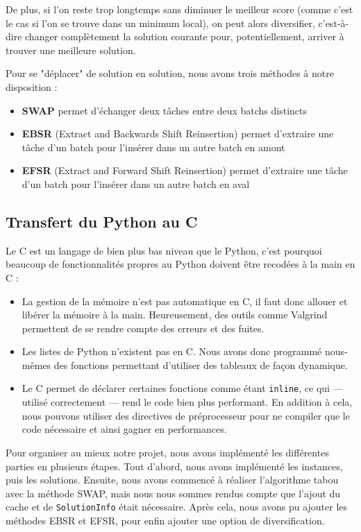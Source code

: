 \documentclass[hideweeklyreports]{polytech/polytech}
\newcommand{\codec}[1]{\texttt{#1}}
\begin{document}
				De plus, si l'on reste trop longtemps sans diminuer le meilleur score (comme c'est le cas si l'on se trouve dans un minimum local), on peut alors diversifier, c'est-à-dire changer complètement la solution courante pour, potentiellement, arriver à trouver une meilleure solution.
				
				\label{methR}
				Pour se "déplacer" de solution en solution, nous avons trois méthodes à notre disposition :
				\begin{itemize}
					\item \textbf{SWAP} permet d'échanger deux tâches entre deux batchs distincts
					\item \textbf{EBSR} (Extract and Backwards Shift Reinsertion) permet d'extraire une tâche d'un batch pour l'insérer dans un autre batch en amont
					\item \textbf{EFSR} (Extract and Forward Shift Reinsertion) permet d'extraire une tâche d'un batch pour l'insérer dans un autre batch en aval
				\end{itemize}
			
			\subsection{Transfert du Python au C}
				Le C est un langage de bien plus bas niveau que le Python, c'est pourquoi beaucoup de fonctionnalités propres au Python doivent être recodées à la main en C :
				\begin{itemize}
					\item La gestion de la mémoire n'est pas automatique en C, il faut donc allouer et libérer la mémoire à la main. Heureusement, des outils comme Valgrind permettent de se rendre compte des erreurs et des fuites.
					\item Les listes de Python n'existent pas en C. Nous avons donc programmé nous-mêmes des fonctions permettant d'utiliser des tableaux de façon dynamique.
					\item Le C permet de déclarer certaines fonctions comme étant \codec{inline}, ce qui --- utilisé correctement --- rend le code bien plus performant. En addition à cela, nous pouvons utiliser des directives de préprocesseur pour ne compiler que le code nécessaire et ainsi gagner en performances.
				\end{itemize}
				
				Pour organiser au mieux notre projet, nous avons implémenté les différentes parties en plusieurs étapes. Tout d'abord, nous avons implémenté les instances, puis les solutions. Ensuite, nous avons commencé à réaliser l'algorithme tabou avec la méthode SWAP, mais nous nous sommes rendus compte que l'ajout du cache et de \codec{SolutionInfo} était nécessaire. Après cela, nous avons pu ajouter les méthodes EBSR et EFSR, pour enfin ajouter une option de diversification.
			
\end{document}
